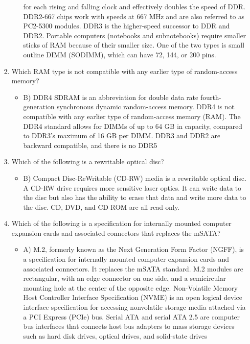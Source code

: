 \documentclass{article}
\begin{document}
\begin{enumerate}
\begin{itemize}
for each rising and falling clock and effectively doubles the speed of DDR. DDR2-667
chips work with speeds at 667 MHz and are also referred to as PC2-5300 modules. DDR3
is the higher-speed successor to DDR and DDR2. Portable computers (notebooks and
subnotebooks) require smaller sticks of RAM because of their smaller size. One of the two
types is small outline DIMM (SODIMM), which can have 72, 144, or 200 pins.
    \end{itemize}
    \item Which RAM type is not compatible with any earlier type of random-access memory?
    \begin{itemize}
        \item B) DDR4 SDRAM is an abbreviation for double data rate fourth-generation synchronous dynamic random-access memory. DDR4 is not compatible with any earlier type of random-access memory (RAM). The DDR4 standard allows for DIMMs of up to 64 GB in capacity, compared to DDR3’s maximum of 16 GB per DIMM. DDR3 and DDR2 are backward compatible, and there is no DDR5
    \end{itemize}
    \item Which of the following is a rewritable optical disc?
    \begin{itemize}
        \item B) Compact Disc-ReWritable (CD-RW) media is a rewritable optical disc. A CD-RW drive requires more sensitive laser optics. It can write data to the disc but also has the ability to erase that data and write more data to the disc. CD, DVD, and CD-ROM are all read-only.
    \end{itemize}
    \item Which of the following is a specification for internally mounted computer expansion cards
and associated connectors that replaces the mSATA?
    \begin{itemize}
        \item A) M.2, formerly known as the Next Generation Form Factor (NGFF), is a specification for internally mounted computer expansion cards and associated connectors. It replaces the mSATA standard. M.2 modules are rectangular, with an edge connector on one side, and a semicircular mounting hole at the center of the opposite edge. Non-Volatile Memory Host Controller Interface Specification (NVME) is an open logical device interface specification for accessing nonvolatile storage media attached via a PCI Express (PCIe) bus. Serial ATA and serial ATA 2.5 are computer bus interfaces that connects host bus adapters to mass storage devices such as hard disk drives, optical drives, and solid-state drives

\end{itemize}
\end{enumerate}
\end{document}
